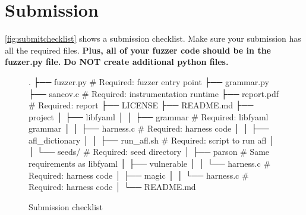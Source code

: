 \documentclass[letterpaper,11pt]{article}
\begin{document}






\section{Submission}
\label{sec:submission}

\autoref{fig:submitchecklist} shows a submission checklist.
Make sure your submission has all the required files.
\textbf{Plus, all of your fuzzer code should be in the fuzzer.py file. Do NOT create additional python files.}

\begin{figure}[ht]
\begin{verbbox}[\footnotesize]
.
├── fuzzer.py            # Required: fuzzer entry point
├── grammar.py
├── sancov.c             # Required: instrumentation runtime
├── report.pdf           # Required: report
├── LICENSE
├── README.md
├── project
│   ├── libfyaml
│   │   ├── grammar      # Required: libfyaml grammar
│   │   ├── harness.c    # Required: harness code
│   │   ├── afl_dictionary
│   │   ├── run_afl.sh   # Required: script to run afl
│   │   └── seeds/       # Required: seed directory
│   ├── parson           # Same requirements as libfyaml
│   ├── vulnerable
│   │   └── harness.c    # Required: harness code
│   ├── magic
│   │   └── harness.c    # Required: harness code
│   └── README.md

\end{verbbox}
\theverbbox
\caption{Submission checklist}
\label{fig:submitchecklist}
\end{figure}
\end{document}

